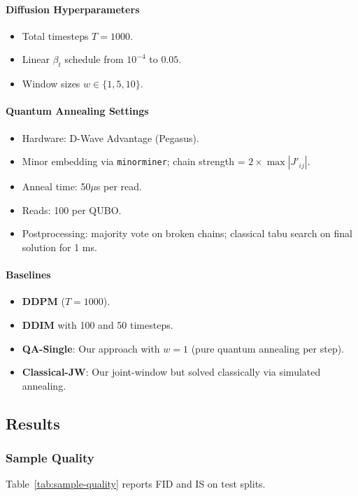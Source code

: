 \documentclass[11pt,letterpaper]{article}
\begin{document}
\paragraph{Diffusion Hyperparameters}
\begin{itemize}[noitemsep,topsep=0pt]
    \item Total timesteps $T=1000$.
    \item Linear $\beta_t$ schedule from $10^{-4}$ to $0.05$.
    \item Window sizes $w \in \{1,5,10\}$.
\end{itemize}

\paragraph{Quantum Annealing Settings}
\begin{itemize}[noitemsep,topsep=0pt]
    \item Hardware: D-Wave Advantage (Pegasus).
    \item Minor embedding via \texttt{minorminer}; chain strength = $2 \times \max|J'_{ij}|$.
    \item Anneal time: 50$\mu$s per read.
    \item Reads: 100 per QUBO.
    \item Postprocessing: majority vote on broken chains; classical tabu search on final solution for 1 ms.
\end{itemize}

\paragraph{Baselines}
\begin{itemize}[noitemsep,topsep=0pt]
    \item \textbf{DDPM} \cite{ho2020denoising} ($T=1000$).
    \item \textbf{DDIM} \cite{song2020denoising} with 100 and 50 timesteps.
    \item \textbf{QA-Single}: Our approach with $w=1$ (pure quantum annealing per step).
    \item \textbf{Classical-JW}: Our joint-window but solved classically via simulated annealing.
\end{itemize}

\subsection{Results}

\subsubsection{Sample Quality}
Table~\ref{tab:sample-quality} reports FID and IS on test splits. 
\end{document}
